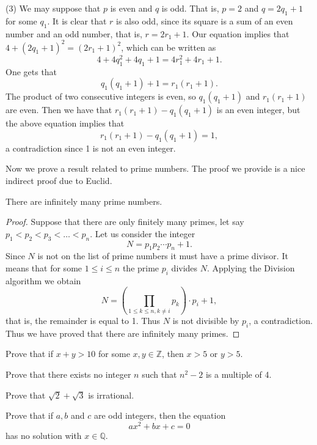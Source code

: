 (3) We may suppose that $p$ is even and $q$ is odd. That is, $p=2$ and $q=2q_1+1$ for some $q_1$. It is clear that $r$ is also odd,
since its square is a sum of an even number and an odd number, that is, $r=2r_1+1$. Our equation implies that
$4+(2q_1+1)^2=(2r_1+1)^2$, which can be written as
$$
4+4q_1^2+4q_1+1=4r_1^2+4r_1+1.
$$
One gets that
$$
q_1(q_1+1)+1=r_1(r_1+1).
$$
The product of two consecutive integers is even, so $q_1(q_1+1)$ and $r_1(r_1+1)$ are even. Then we have that $r_1(r_1+1)-q_1(q_1+1)$
is an even integer, but the above equation implies that 
$$
r_1(r_1+1)-q_1(q_1+1)=1,
$$
a contradiction since 1 is not an even integer.

Now we prove a result related to prime numbers. The proof we provide is a nice indirect proof due to Euclid.
\begin{proposition}
There are infinitely many prime numbers.
\end{proposition}
\begin{proof}
Suppose that there are only finitely many primes, let say $p_1<p_2<p_3<\ldots<p_n$. Let us consider the integer
$$
N=p_1p_2\cdots p_n+1.
$$
Since $N$ is not on the list of prime numbers it must have a prime divisor. It means that for some $1\leq i\leq n$
the prime $p_i$ divides $N$. Applying the Division algorithm we obtain
$$
N=\left(\prod_{1\leq k\leq n, k\neq i}p_k\right)\cdot p_i+1,
$$
that is, the remainder is equal to 1. Thus $N$ is not divisible by $p_i$, a contradiction. Thus we have proved
that there are infinitely many primes.
\end{proof}

\begin{exercise}\label{contra-0}
Prove that if $x+y>10$ for some $x,y\in\mathbb{Z}$, then $x>5$ or $y>5$. 
\end{exercise}

\begin{exercise}\label{contra-0a}
Prove that there exists no integer $n$ such that $n^2-2$ is a multiple of 4.
\end{exercise}

\begin{exercise}\label{contra-1}
Prove that $\sqrt{2}+\sqrt{3}$ is irrational.
\end{exercise}

\begin{exercise}\label{contra-2}
Prove that if $a,b$ and $c$ are odd integers, then the equation
$$
ax^2+bx+c=0
$$
has no solution with $x\in\mathbb{Q}$.
\end{exercise}

